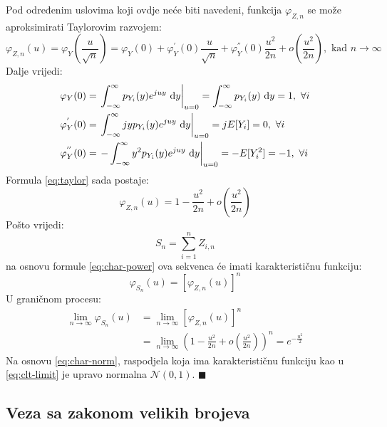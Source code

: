 Pod određenim uslovima koji ovdje neće biti navedeni, funkcija $\varphi_{Z,n}$
se može aproksimirati Taylorovim razvojem:
\begin{equation} \label{eq:taylor}
  \varphi_{Z,n}(u) = \varphi_Y\left(\frac{u}{\sqrt{n}}\right) 
  = \varphi_Y(0) + \varphi_Y^{'}(0)\frac{u}{\sqrt{n}}
  + \varphi_Y^{''}(0)\frac{u^2}{2n} + o\left(\frac{u^2}{2n}\right),
    \text{ kad } n\to\infty
\end{equation}
%
Dalje vrijedi:
\begin{align*}
  \varphi_Y(0)
    &= \left.\int_{-\infty}^{\infty} p_{Y_i}(y) e^{juy} \ \text dy\right|_{u=0}
    = \int_{-\infty}^{\infty} p_{Y_i}(y) \ \text dy = 1,\  \forall i \\
  \varphi_Y^{'}(0)
    &= \left.\int_{-\infty}^{\infty} jyp_{Y_i}(y)e^{juy} \ \text dy \right|_{u=0}
    = jE[Y_i] = 0,\ \forall i \\
  \varphi_Y^{''}(0)
    &= \left.-\int_{-\infty}^{\infty} y^2 p_{Y_i}(y)e^{juy} \ \text dy\right|_{u=0}
    = -E[Y_i^2] = -1,\ \forall i
\end{align*}
%
Formula \eqref{eq:taylor} sada postaje:
\begin{equation}
  \varphi_{Z,n}(u) = 1 - \frac{u^2}{2n} + o\left(\frac{u^2}{2n}\right)
\end{equation}
%
Pošto vrijedi:
\begin{equation}
  S_n = \sum_{i=1}^{n} Z_{i,n}
\end{equation}
na osnovu formule \eqref{eq:char-power} ova sekvenca će imati karakterističnu
funkciju:
\begin{equation}
  \varphi_{S_n}(u) = \left[\varphi_{Z,n}(u)\right]^n
\end{equation}
U graničnom procesu:
\begin{align*} \label{eq:clt-limit}
  \lim_{n\to\infty} \varphi_{S_n}(u)
  &= \lim_{n\to\infty} [\varphi_{Z,n}(u)]^n \nonumber \\
  &= \lim_{n\to\infty}
    \left(1 - \frac{u^2}{2n} + o\left(\frac{u^2}{2n}\right)\right)^n
    = e^{-\frac{u^2}{2}}
\end{align*}
Na osnovu \eqref{eq:char-norm}, raspodjela koja ima karakterističnu funkciju kao
u \eqref{eq:clt-limit} je upravo normalna $\mathcal{N}(0,1)$. $\blacksquare$ \\

\subsection{Veza sa zakonom velikih brojeva} \label{sec:clt-lln}

